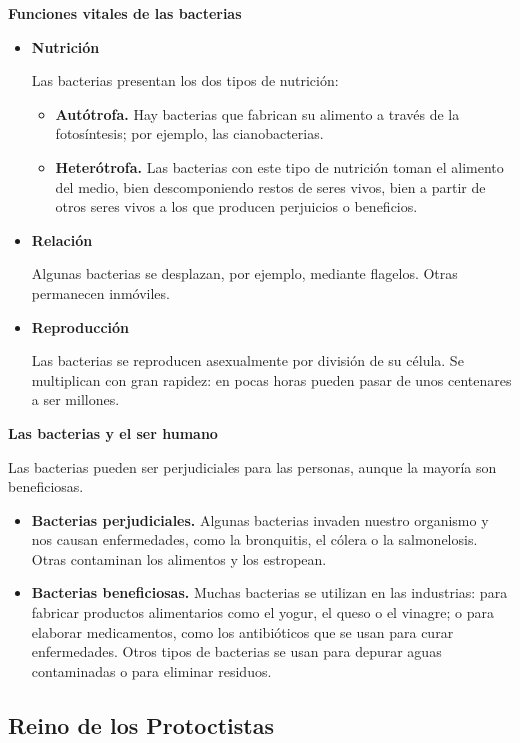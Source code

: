 \textbf{Funciones vitales de las bacterias}

\begin{itemize}
    \item \textbf{Nutrición}

    Las bacterias presentan los dos tipos de nutrición:

    \begin{itemize}
        \item \textbf{Autótrofa.} Hay bacterias que fabrican su alimento a través de la fotosíntesis; por ejemplo, las cianobacterias.
        \item \textbf{Heterótrofa.} Las bacterias con este tipo de nutrición toman el alimento del medio, bien descomponiendo restos de seres vivos, bien a partir de otros seres vivos a los que producen perjuicios o beneficios.
    \end{itemize}
    \item \textbf{Relación}

    Algunas bacterias se desplazan, por ejemplo, mediante flagelos. Otras permanecen inmóviles.
    \item \textbf{Reproducción}

    Las bacterias se reproducen asexualmente por división de su célula. Se multiplican con gran rapidez: en pocas horas pueden pasar de unos centenares a ser millones.
\end{itemize}

\textbf{Las bacterias y el ser humano}

Las bacterias pueden ser perjudiciales para las personas, aunque la mayoría son beneficiosas.

\begin{itemize}
    \item \textbf{Bacterias perjudiciales.} Algunas bacterias invaden nuestro organismo y nos causan enfermedades, como la bronquitis, el cólera o la salmonelosis. Otras contaminan los alimentos y los estropean.
    \item \textbf{Bacterias beneficiosas.} Muchas bacterias se utilizan en las industrias: para fabricar productos alimentarios como el yogur, el queso o el vinagre; o para elaborar medicamentos, como los antibióticos que se usan para curar enfermedades. Otros tipos de bacterias se usan para depurar aguas contaminadas o para eliminar residuos.
\end{itemize}


\subsection{Reino de los Protoctistas}

